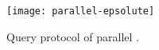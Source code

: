 \begin{figure}[th]
	\centering
	\texttt{[image: parallel-epsolute]}
	\caption{Query protocol \protocolQuery{} of parallel \epsolute{}.}\label{figure:parallel-epsolute}
\end{figure}

